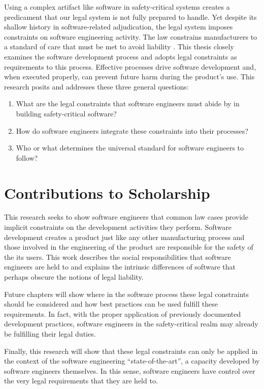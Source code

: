 \documentclass[12pt]{report}
\begin{document}
Using a complex artifact like software in safety-critical systems creates a predicament that our legal system is not fully prepared to handle. Yet despite its shallow history in software-related adjudication, the legal system imposes constraints on software engineering activity. The law constrains manufacturers to a standard of care that must be met to avoid liability \cite{FAKE}. This thesis closely examines the software development process and adopts legal constraints as requirements to this process. Effective processes drive software development and, when executed properly, can prevent future harm during the product's use. This research posits and addresses these three general questions: \singlespace 
\begin{enumerate} 
\item What are the legal constraints that software engineers must abide by in building safety-critical software? 
\item How do software engineers integrate these constraints into their processes? 
\item Who or what determines the universal standard for software engineers to follow? 
\end{enumerate}\doublespace 

\section{Contributions to Scholarship} 

This research seeks to show software engineers that common law cases provide implicit constraints on the development activities they perform. Software development  creates a product just like any other manufacturing process and those involved in the engineering of the product are responsible for the safety of the its users. This work describes the social responsibilities that software engineers are held to and explains the intrinsic differences of software that perhaps obscure the notions of legal liability.

Future chapters will show where in the software process these legal constraints should be considered and how best practices can be used fulfill these requirements. In fact, with the proper application of previously documented development practices, software engineers in the safety-critical realm may already be fulfilling their legal duties.

Finally, this research will show that these legal constraints can only be applied in the context of the software engineering ``state-of-the-art'', a capacity developed by software engineers themselves. In this sense, software engineers have control over the very legal requirements that they are held to.
\end{document}
